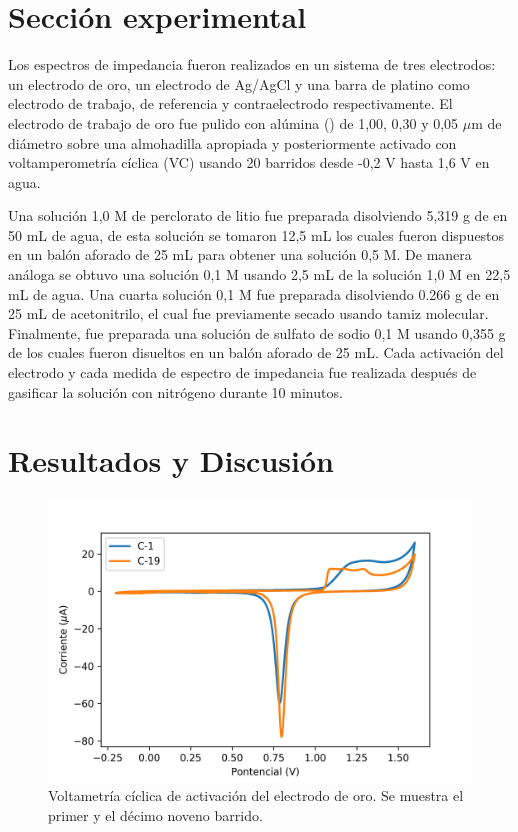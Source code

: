 \documentclass[fleqn,11pt]{SelfArx}
\begin{document}
	\section{Secci\'on experimental}
	Los espectros de impedancia fueron realizados en un sistema de tres electrodos: un electrodo de oro, un electrodo de Ag/AgCl y una barra de platino como electrodo de trabajo, de referencia y contraelectrodo respectivamente. El electrodo de trabajo de oro fue pulido con al\'umina () de 1,00, 0,30 y 0,05 $\mu$m de diámetro sobre una almohadilla apropiada y posteriormente activado con voltamperometría cíclica (VC) usando 20 barridos desde -0,2 V hasta 1,6 V en agua. 
	
	Una solución 1,0 M de perclorato de litio fue preparada disolviendo 5,319 g de  en 50 mL de agua, de esta solución se tomaron 12,5 mL los cuales fueron dispuestos en un balón aforado de 25 mL para obtener una solución 0,5 M. De manera análoga se obtuvo una solución 0,1 M usando 2,5 mL de la solución 1,0 M en 22,5 mL de agua. Una cuarta solución 0,1 M fue preparada disolviendo 0.266 g de  en 25 mL de acetonitrilo, el cual fue previamente secado usando tamiz molecular. Finalmente, fue preparada una solución de sulfato de sodio 0,1 M usando 0,355 g de  los cuales fueron disueltos en un balón aforado de 25 mL. Cada activación del electrodo y cada medida de espectro de impedancia fue realizada después de gasificar la solución con nitrógeno durante 10 minutos.
		
	\section{Resultados y Discusi\'on}
	\begin{figure}[h]
		\centering
		\includegraphics[width=\linewidth]{voltametrias}
		\caption{Voltametr\'ia c\'iclica de activaci\'on del electrodo de oro. Se muestra el primer y el d\'ecimo noveno barrido.}
		\label{fig: VC}
	\end{figure}
\end{document}
